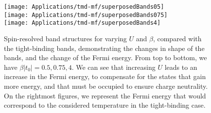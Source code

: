 \begin{figure}[H]
\texttt{[image: Applications/tmd-mf/superposedBands05]} \\
\texttt{[image: Applications/tmd-mf/superposedBands075]} \\
\texttt{[image: Applications/tmd-mf/superposedBands4]} \\
	\caption[Spin-resolved band structures for varying $U$ and $\beta$, compared with the tight-binding bands.]{Spin-resolved band structures for varying $U$ and $\beta$, compared with the tight-binding bands, demonstrating the changes in shape of the bands, and the change of the Fermi energy.
	From top to bottom, we have $\beta | t_0 | = 0.5, 0.75, 4$.
	We can see that increasing $U$ leads to an increase in the Fermi energy, to compensate for the states that gain more energy, and that must be occupied to ensure charge neutrality.
	On the rightmost figures, we represent the Fermi energy that would correspond to the  considered temperature in the tight-binding case.}
	\label{fig:band-structures}
\end{figure}

